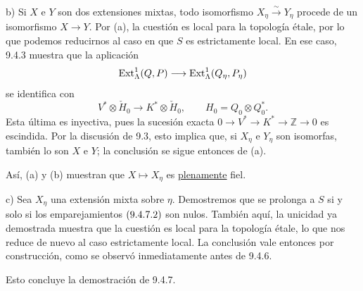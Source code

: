 \smallskip
\noindent
b) Si $X$ e $Y$ son dos extensiones mixtas, todo isomorfismo
$X_\eta\xrightarrow{\sim}Y_\eta$ procede de un isomorfismo
$X\longrightarrow Y$. Por (a), la cuestión es local para la topología
étale, por lo que podemos reducirnos al caso en que $S$ es estrictamente
local. En ese caso, 9.4.3 muestra que la aplicación
\begin{equation*}
 \Ext^1_\Lambda(\sisi{P,Q}{Q,P})
 \longrightarrow
 \Ext^1_\Lambda(\sisi{P_\eta,Q_\eta}{Q_\eta,P_\eta})
\end{equation*}
se identifica con
\begin{equation*}
 V^*\otimes\check H_0\longrightarrow K^*\otimes\check H_0,
 \qquad H_0=Q_0\otimes Q_0^*.
\end{equation*}
Esta última es inyectiva, pues la sucesión exacta
$0\longrightarrow V^*\longrightarrow K^*\longrightarrow\mathbb Z
\longrightarrow0$ es escindida. Por la discusión de 9.3, esto implica
que, si $X_\eta$ e $Y_\eta$ son isomorfas, también lo son $X$ e $Y$; la
conclusión se sigue entonces de (a).

Así, (a) y (b) muestran que $X\longmapsto X_\eta$ es
\underline{plenamente} fiel.


\smallskip
\noindent
c) Sea $X_\eta$ una extensión mixta sobre $\eta$. Demostremos que se
prolonga a $S$ si y solo si los emparejamientos
$(\sisi{9.4.6.2}{9.4.7.2})$ son nulos. También aquí, la unicidad ya
demostrada muestra que la cuestión es local para la topología étale, lo
que nos reduce de nuevo al caso estrictamente local. La conclusión vale
entonces por construcción, como se observó inmediatamente antes de
9.4.6.

Esto concluye la demostración de 9.4.7.
